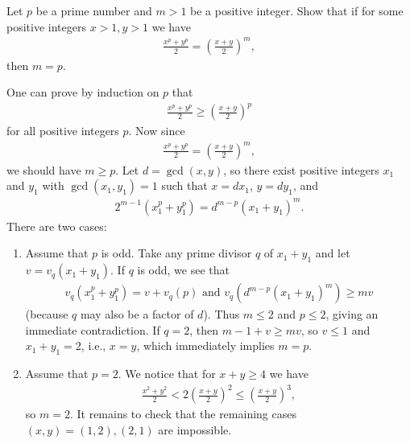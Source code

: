\documentclass[main.tex]{subfile}
\begin{document}
    \begin{problem}[Balkan 1993]
        Let $p$ be a prime number and $m>1$ be a positive integer. Show that if for some positive integers $x>1, y>1$ we have
        \begin{align*}
	        \frac{x^p+y^p}{2}= \left( \frac{x+y}{2} \right)^m,
        \end{align*}
        then $m=p.$
    \end{problem}

    \begin{solution}
        One can prove by induction on $p$ that
        	\begin{align*}
        		\frac{x^p+y^p}2\ge \left(\frac{x+y}2\right)^p
        	\end{align*}
        for all positive integers $p$. Now since
        	\begin{align*}
        		\frac{x^p+y^p}{2}= \left( \frac{x+y}{2} \right)^m,
        	\end{align*}
        we should have $ m \geq p$. Let $d=\gcd(x,y)$, so there exist positive integers
        $x_1$ and $y_1$ with $\gcd(x_1,y_1)=1$ such that $x=dx_1$, $y=dy_1$, and
        	\begin{align*}
        		2^{m-1}(x_1^p+y_1^p)=d^{m-p}(x_1+y_1)^m.
        	\end{align*}
        There are two cases:

        \begin{enumerate}
        	\item Assume that $p$ is odd. Take any prime divisor $q$ of $x_1+y_1$ and let $v=v_q(x_1+y_1)$. If $q$ is odd, we see that
        		\begin{align*}
        			v_q(x_1^p +y_1^p)=v+v_q(p) \text{ and } v_q(d^{m-p}(x_1+y_1)^m) \geq mv
        		\end{align*}
        	(because $q$  may also be a factor of $d$).
        	Thus $m\le 2$ and $p\le 2$, giving an immediate contradiction. If $q=2$, then $m-1+v\ge mv$, so $v\le 1$ and $x_1+y_1=2$, i.e., $x=y$, which immediately implies $m=p$.

        	\item Assume that $p=2$. We notice that for $x+y \geq 4$ we have
        		\begin{align*}
        			\frac{x^2+y^2}2< 2\left(\frac{x+y}2\right)^2\le \left(\frac{x+y}2\right)^3,
        		\end{align*}
        	so $m=2$. It remains to check that the remaining cases $(x,y)=(1,2),(2,1)$ are impossible.
        \end{enumerate}

    \end{solution}
\end{document}
